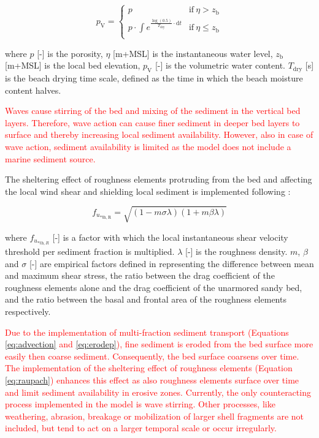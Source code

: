 \begin{equation}
  \label{eq:drying}
  p_{\mathrm{V}} = \left\{
    \begin{array}{ll}
      p & \mathrm{if} ~ \eta > z_{\mathrm{b}} \\
      p \cdot \int e^{\frac{\log \left( 0.5 \right)}{T_{\mathrm{dry}}} \cdot \mathrm{d} t} & \mathrm{if} ~ \eta \leq z_{\mathrm{b}} \\
    \end{array}
  \right.
\end{equation}

\noindent where $p$ [-] is the porosity, $\eta$ [m+MSL] is the
instantaneous water level, $z_{\mathrm{b}}$ [m+MSL] is the local bed
elevation, $p_{\mathrm{V}}$ [-] is the volumetric water
content. $T_{\mathrm{dry}}$ [s] is the beach drying time scale,
defined as the time in which the beach moisture content halves.

\textcolor{red}{Waves cause stirring of the bed and mixing of the
  sediment in the vertical bed layers. Therefore, wave action can
  cause finer sediment in deeper bed layers to surface and thereby
  increasing local sediment availability. However, also in case of
  wave action, sediment availability is limited as the model does not
  include a marine sediment source.}

The sheltering effect of roughness elements protruding from the bed
and affecting the local wind shear and shielding local sediment is
implemented following \citet{Raupach1993}:

\begin{equation}
  \label{eq:raupach}
  f_{u_{\mathrm{* th, R}}} = \sqrt{ \left( 1 - m \sigma \lambda \right) \left( 1 + m \beta \lambda \right) }
\end{equation}

\noindent where $f_{u_{\mathrm{* th},R}}$ [-] is a factor with which
the local instantaneous shear velocity threshold per sediment fraction
is multiplied. $\lambda$ [-] is the roughness density. $m$, $\beta$
and $\sigma$ [-] are empirical factors defined in \citet{Raupach1993}
representing the difference between mean and maximum shear stress, the
ratio between the drag coefficient of the roughness elements alone and
the drag coefficient of the unarmored sandy bed, and the ratio between
the basal and frontal area of the roughness elements respectively.

\textcolor{red}{Due to the implementation of multi-fraction sediment
  transport (Equations \ref{eq:advection} and \ref{eq:erodep}), fine
  sediment is eroded from the bed surface more easily then coarse
  sediment. Consequently, the bed surface coarsens over time. The
  implementation of the sheltering effect of roughness elements
  (Equation \ref{eq:raupach}) enhances this effect as also roughness
  elements surface over time and limit sediment availability in
  erosive zones. Currently, the only counteracting process implemented
  in the model is wave stirring. Other processes, like weathering,
  abrasion, breakage or mobilization of larger shell fragments are not
  included, but tend to act on a larger temporal scale or occur
  irregularly.}


